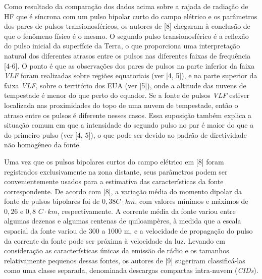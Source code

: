 \documentclass[a4paper, 12pt, onecolumn,singlespacing]{article}
\begin{document}
	Como resultado da comparação dos dados acima sobre a rajada de radiação de HF que é síncrona com um pulso bipolar curto do campo elétrico e os parâmetros dos pares de pulsos transionosféricos, os autores de [8] chegaram à conclusão de que o fenômeno físico é o mesmo. O segundo pulso transionosférico é a reflexão do pulso inicial da superfície da Terra, o que proporciona uma interpretação natural dos diferentes atrasos entre os pulsos nas diferentes faixas de frequência [4-6]. O ponto é que as observações dos pares de pulsos na parte inferior da faixa \textit{VLF} foram realizadas sobre regiões equatoriais (ver [4, 5]), e na parte superior da faixa \textit{VLF}, sobre o território dos EUA (ver [5]), onde a altitude das nuvens de tempestade é menor do que perto do equador. Se a fonte de pulsos \textit{VLF} estiver localizada nas proximidades do topo de uma nuvem de tempestade, então o atraso entre os pulsos é diferente nesses casos. Essa suposição também explica a situação comum em que a intensidade do segundo pulso no par é maior do que a do primeiro pulso (ver [4, 5]), o que pode ser devido ao padrão de diretividade não homogêneo da fonte.
	
	Uma vez que os pulsos bipolares curtos do campo elétrico em [8] foram registrados exclusivamente na zona distante, seus parâmetros podem ser convenientemente usados para a estimativa das características da fonte correspondente. De acordo com [8], a variação média do momento dipolar da fonte de pulsos bipolares foi de $0,38 C·km$, com valores mínimos e máximos de $0,26$ e $0,8$ $C·km$, respectivamente. A corrente média da fonte variou entre algumas dezenas e algumas centenas de quiloampères, à medida que a escala espacial da fonte variou de 300 a 1000 m, e a velocidade de propagação do pulso da corrente da fonte pode ser próxima à velocidade da luz. Levando em consideração as características únicas da emissão de rádio e os tamanhos relativamente pequenos dessas fontes, os autores de [9] sugeriram classificá-las como uma classe separada, denominada descargas compactas intra-nuvem (\textit{CIDs}).
	
\end{document}
